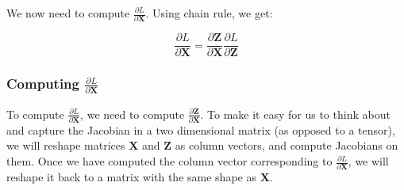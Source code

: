 \documentclass{article}
\newcommand{\matr}[1]{\mathbf{#1}} %
\begin{document}
We now need to compute $\frac{\partial L}{\partial \matr{X}}$. Using chain rule, we get:

\begin{equation} \label{dX_elewise_single_matrix}
\frac{\partial L}{\partial \matr{X}} = \frac{\partial \matr{Z}}{\partial \matr{X}}\frac{\partial L}{\partial \matr{Z}}
\end{equation}

\subsubsection{Computing $\frac{\partial L}{\partial \matr{X}}$}
To compute $\frac{\partial L}{\partial \matr{X}}$, we need to compute $\frac{\partial \matr{Z}}{\partial \matr{X}}$. To make it easy for us to think about and capture the Jacobian in a two dimensional matrix (as opposed to a tensor), we will reshape matrices $\matr{X}$ and $\matr{Z}$ as column vectors, and compute Jacobians on them. Once we have computed the column vector corresponding to $\frac{\partial L}{\partial \matr{X}}$, we will reshape it back to a matrix with the same shape as $\matr{X}$.
\end{document}
